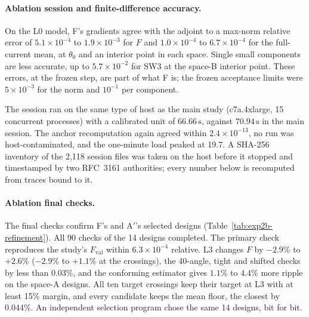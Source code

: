 \documentclass{anvil-paper}
\begin{document}
\paragraph{Ablation session and finite-difference accuracy.}
On the L0 model, F's gradients agree with the adjoint to a max-norm
relative error of $5.1\times10^{-4}$ to $1.9\times10^{-3}$ for $F$ and
$1.0\times10^{-4}$ to $6.7\times10^{-4}$ for the full-current mean, at
$\theta_0$ and an interior point in each space. Single small components are
less accurate, up to $5.7\times10^{-2}$ for SW3 at the space-B interior
point. These errors, at the frozen step, are part of what F is; the frozen
acceptance limits were $5\times10^{-3}$ for the norm and $10^{-1}$ per
component.

The session ran on the same type of host as the main study (c7a.4xlarge,
15 concurrent processes) with a calibrated unit of $66.66\,\mathrm{s}$,
against $70.94\,\mathrm{s}$ in the main session. The anchor recomputation
again agreed within $2.4\times10^{-13}$, no run was host-contaminated, and
the one-minute load peaked at 19.7. A SHA-256 inventory of the 2,118
session files was taken on the host before it stopped and timestamped by
two RFC~3161 authorities; every number below is recomputed from traces
bound to it.

\paragraph{Ablation final checks.}
The final checks confirm F's and A$'$'s selected designs
(Table~\ref{tab:exp2b-refinement}). All 90 checks of the 14 designs
completed. The primary check reproduces the study's $F_{\mathrm{val}}$
within $6.3\times10^{-4}$ relative. L3 changes $F$ by $-2.9\%$ to $+2.6\%$
($-2.9\%$ to $+1.1\%$ at the crossings), the 40-angle, tight and shifted
checks by less than $0.03\%$, and the conforming estimator gives $1.1\%$ to
$4.4\%$ more ripple on the space-A designs. All ten target crossings keep
their target at L3 with at least 15\% margin, and every candidate keeps the
mean floor, the closest by 0.044\%. An independent selection program chose
the same 14 designs, bit for bit.

\begin{table}[H]\centering\small
\caption{Post-hoc ablation (Section~\ref{sec:exp2-fd}): charged time units
to the first attaining validation for A$'$ and F, repeat~1, and their
ratio per start; the last column gives the geometric mean, with repeat~2 in
parentheses. Units are those of the ablation session.}
\label{tab:exp2b-ratios}
\end{table}
\end{document}
